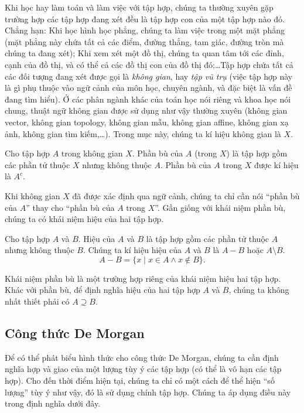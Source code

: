 Khi học hay làm toán và làm việc với tập hợp, chúng ta thường xuyên gặp trường hợp các tập hợp đang xét đều là tập hợp con của một tập hợp nào đó. Chẳng hạn: Khi học hình học phẳng, chúng ta làm việc trong một mặt phẳng (mặt phẳng này chứa tất cả các điểm, đường thẳng, tam giác, đường tròn mà chúng ta đang xét); Khi xem xét một đồ thị, chúng ta quan tâm tới các đỉnh, cạnh của đồ thị, và có thể cả các đồ thị con của đồ thị đó;\ldots Tập hợp chứa tất cả các đối tượng đang xét được gọi là \textit{không gian}, hay \textit{tập vũ trụ}  (việc tập hợp này là gì phụ thuộc vào ngữ cảnh của môn học, chuyên ngành, và đặc biệt là vấn đề đang tìm hiểu). Ở các phân ngành khác của toán học nói riêng và khoa học nói chung, thuật ngữ không gian được sử dụng như vậy thường xuyên (không gian vector, không gian topology, không gian mẫu, không gian affine, không gian xạ ảnh, không gian tìm kiếm,\ldots). Trong mục này, chúng ta kí hiệu không gian là $X$.

\begin{definition}[Phần bù]
    Cho tập hợp $A$ trong không gian $X$. Phần bù của $A$ (trong $X$) là tập hợp gồm các phần tử thuộc $X$ nhưng không thuộc $A$. Phần bù của $A$ trong $X$ được kí hiệu là $A^{c}$.
\end{definition}

Khi không gian $X$ đã được xác định qua ngữ cảnh, chúng ta chỉ cần nói ``phần bù của $A$'' thay cho ``phần bù của $A$ trong $X$''. Gần giống với khái niệm phần bù, chúng ta có khái niệm hiệu của hai tập hợp.

\begin{definition}
    Cho tập hợp $A$ và $B$. Hiệu của $A$ và $B$ là tập hợp gồm các phần tử thuộc $A$ nhưng không thuộc $B$. Chúng ta kí hiệu hiệu của $A$ và $B$ là $A - B$ hoặc $A\setminus B$.
    \[
        A - B = \{ x \mid x\in A \wedge x\notin B \}.
    \]
\end{definition}

Khái niệm phần bù là một trường hợp riêng của khái niệm hiệu hai tập hợp. Khác với phần bù, để định nghĩa hiệu của hai tập hợp $A$ và $B$, chúng ta không nhất thiết phải có $A\supseteq B$.

\subsection{Công thức De Morgan}

Để có thể phát biểu hình thức cho công thức De Morgan, chúng ta cần định nghĩa hợp và giao của một lượng tùy ý các tập hợp (có thể là vô hạn các tập hợp). Cho đến thời điểm hiện tại, chúng ta chỉ có một cách để thể hiện ``số lượng'' tùy ý như vậy, đó là sử dụng chính tập hợp. Chúng ta áp dụng điều này trong định nghĩa dưới đây.

